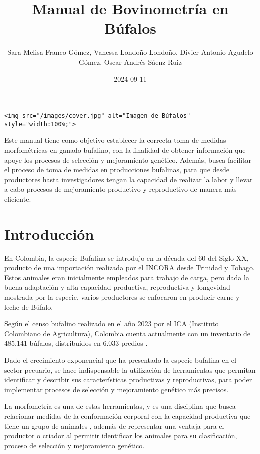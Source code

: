 \documentclass[
]{book}
\title{Manual de Bovinometría en Búfalos}
\author{Sara Melisa Franco Gómez, Vanessa Londoño Londoño, Divier Antonio Agudelo Gómez, Oscar Andrés Sáenz Ruiz}
\date{2024-09-11}
\begin{document}
\maketitle

{
\setcounter{tocdepth}{1}
\tableofcontents
}
\begin{verbatim}
<img src="/images/cover.jpg" alt="Imagen de Búfalos" style="width:100%;">
\end{verbatim}

Este manual tiene como objetivo establecer la correcta
toma de medidas morfométricas en ganado bufalino,
con la finalidad de obtener información que apoye los
procesos de selección y mejoramiento genético.
Además, busca facilitar el proceso de toma de medidas
en producciones bufalinas, para que desde productores hasta
investigadores tengan la capacidad de realizar la labor y llevar
a cabo procesos de mejoramiento productivo y reproductivo de manera más
eficiente.

\chapter{Introducción}\label{introducciuxf3n}

En Colombia, la especie Bufalina se introdujo en la década del 60 del Siglo XX, producto de una importación realizada por el INCORA desde Trinidad y Tobago. Estos animales eran inicialmente empleados para trabajo de carga, pero dada la buena adaptación y alta capacidad productiva, reproductiva y longevidad mostrada por la especie, varios productores se enfocaron en producir carne y leche de Búfalo.

Según el censo bufalino realizado en el año 2023 por el ICA (Instituto Colombiano de Agricultura), Colombia cuenta actualmente con un inventario de 485.141 búfalos, distribuidos en 6.033 predios \citep{ICA2022}.

Dado el crecimiento exponencial que ha presentado la especie bufalina en el sector pecuario, se hace indispensable la utilización de herramientas que permitan identificar y describir sus características productivas y reproductivas, para poder implementar procesos de selección y mejoramiento genético más precisos.

La morfometría es una de estas herramientas, y es una disciplina que busca relacionar medidas de la conformación corporal con la capacidad productiva que tiene un grupo de animales \citep{Cardenas2018}, además de representar una ventaja para el productor o criador al permitir identificar los animales para su clasificación, proceso de selección y mejoramiento genético.
\end{document}

